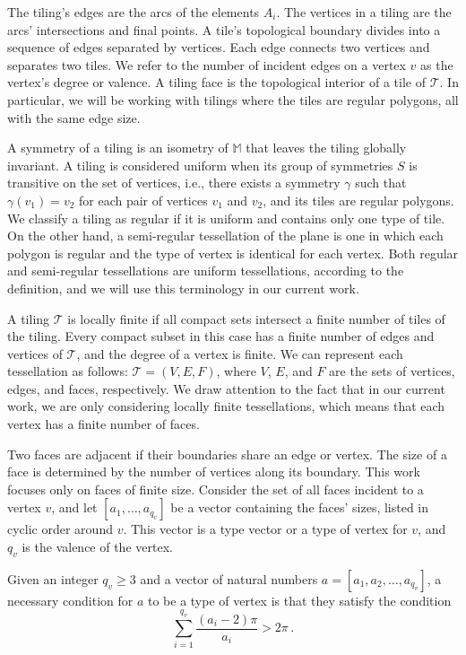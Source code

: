 \documentclass[%
reprint,
amsmath,amssymb,
aps,
]{revtex4-2}
\newcommand{\tes}{\mathcal{T}}
\newcommand{\M}{\mathbb{M}}
\begin{document}
The tiling's edges are the arcs of the elements $A_i$. The vertices in a tiling are the arcs' intersections and final points. A tile's topological boundary divides into a sequence of edges separated by vertices. Each edge connects two vertices and separates two tiles. We refer to the number of incident edges on a vertex $v$ as the vertex's degree or valence. A tiling face is the topological interior of a tile of $\tes$. In particular, we will be working with tilings where the tiles are regular polygons, all with the same edge size.

A symmetry of a tiling is an isometry of $\M$ that leaves the tiling globally invariant. A tiling is considered uniform when its group of symmetries $S$ is transitive on the set of vertices, i.e., there exists a symmetry $\gamma$ such that $\gamma(v_1) = v_2$ for each pair of vertices $v_1$ and $v_2$, and its tiles are regular polygons. We classify a tiling as regular if it is uniform and contains only one type of tile. On the other hand, a semi-regular tessellation of the plane is one in which each polygon is regular and the type of vertex is identical for each vertex. Both regular and semi-regular tessellations are uniform tessellations, according to the definition, and we will use this terminology in our current work.

A tiling $\tes$ is locally finite if all compact sets intersect a finite number of tiles of the tiling. Every compact subset in this case has a finite number of edges and vertices of $\tes$, and the degree of a vertex is finite. We can represent each tessellation as follows: $\tes = (V, E, F)$, where $V$, $E$, and $F$ are the sets of vertices, edges, and faces, respectively. We draw attention to the fact that in our current work, we are only considering locally finite tessellations, which means that each vertex has a finite number of faces. 

Two faces are adjacent if their boundaries share an edge or vertex. The size of a face is determined by the number of vertices along its boundary. This work focuses only on faces of finite size. Consider the set of all faces incident to a vertex $v$, and let $[a_1, \hdots, a_{q_v}]$ be a vector containing the faces' sizes, listed in cyclic order around $v$. This vector is a type vector or a type of vertex for $v$, and $q_v$ is the valence of the vertex.

Given an integer $q_v \geq 3$ and a vector of natural numbers $a = [a_1, a_2, \hdots, a_{q_v}]$, a necessary condition for $a$ to be a type of vertex is that they satisfy the condition 
\begin{equation}
	\label{cond}	
	\sum_{i =1}^{q_v}\frac{(a_i-2)\pi}{a_i}>2\pi \,.
\end{equation}
\end{document}
